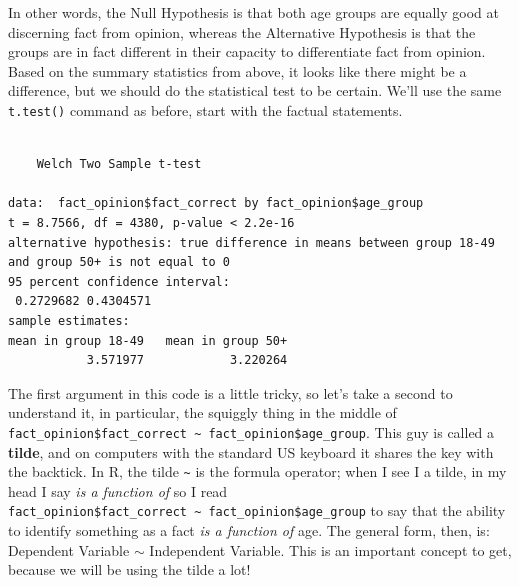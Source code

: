\documentclass[
  letterpaper,
]{book}
\newenvironment{Shaded}{\begin{snugshade}}{\end{snugshade}}
\newcommand{\AttributeTok}[1]{\textcolor[rgb]{0.40,0.45,0.13}{#1}}
\newcommand{\DecValTok}[1]{\textcolor[rgb]{0.68,0.00,0.00}{#1}}
\newcommand{\FunctionTok}[1]{\textcolor[rgb]{0.28,0.35,0.67}{#1}}
\newcommand{\NormalTok}[1]{\textcolor[rgb]{0.00,0.23,0.31}{#1}}
\newcommand{\SpecialCharTok}[1]{\textcolor[rgb]{0.37,0.37,0.37}{#1}}
\newcommand{\StringTok}[1]{\textcolor[rgb]{0.13,0.47,0.30}{#1}}
\begin{document}
In other words, the Null Hypothesis is that both age groups are equally
good at discerning fact from opinion, whereas the Alternative Hypothesis
is that the groups are in fact different in their capacity to
differentiate fact from opinion. Based on the summary statistics from
above, it looks like there might be a difference, but we should do the
statistical test to be certain. We'll use the same \texttt{t.test()}
command as before, start with the factual statements.

\begin{Shaded}
\end{Shaded}

\begin{verbatim}

    Welch Two Sample t-test

data:  fact_opinion$fact_correct by fact_opinion$age_group
t = 8.7566, df = 4380, p-value < 2.2e-16
alternative hypothesis: true difference in means between group 18-49 and group 50+ is not equal to 0
95 percent confidence interval:
 0.2729682 0.4304571
sample estimates:
mean in group 18-49   mean in group 50+ 
           3.571977            3.220264 
\end{verbatim}

The first argument in this code is a little tricky, so let's take a
second to understand it, in particular, the squiggly thing in the middle
of
\texttt{fact\_opinion\$fact\_correct\ \textasciitilde{}\ fact\_opinion\$age\_group}.
This guy is called a \textbf{tilde}, and on computers with the standard
US keyboard it shares the key with the backtick. In R, the tilde
\texttt{\textasciitilde{}} is the formula operator; when I see I a
tilde, in my head I say \emph{is a function of} so I read
\texttt{fact\_opinion\$fact\_correct\ \textasciitilde{}\ fact\_opinion\$age\_group}
to say that the ability to identify something as a fact \emph{is a
function of} age. The general form, then, is: Dependent Variable
\(\sim\) Independent Variable. This is an important concept to get,
because we will be using the tilde a lot!
\end{document}

